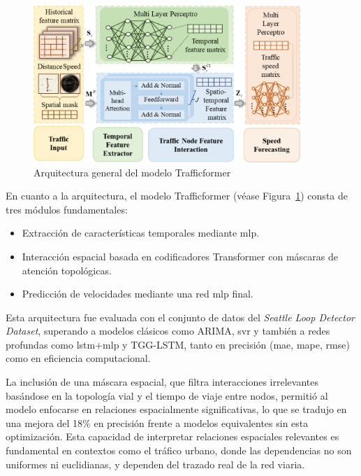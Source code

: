 \begin{figure}[H]
	\centering
	\includegraphics[width=0.9\textwidth]{includes/fnbot-19-1527908-g001.jpg}
	\caption{Arquitectura general del modelo Trafficformer \cite{trafficformer}}
	\label{fig:trafficformer}
\end{figure}

En cuanto a la arquitectura, el modelo Trafficformer (véase Figura~\ref{fig:trafficformer}) consta de tres módulos fundamentales:
\begin{itemize}
	\item[(1)] Extracción de características temporales mediante \acrlong{mlp}. 
	\item[(2)] Interacción espacial basada en codificadores Transformer con máscaras de atención topológicas. 
	\item[(3)] Predicción de velocidades mediante una red \acrshort{mlp} final. 
\end{itemize}

Esta arquitectura fue evaluada con el conjunto de datos del \textit{Seattle Loop Detector Dataset}, superando a modelos clásicos como ARIMA, \acrshort{svr} y también a redes profundas como \acrshort{lstm}+\acrshort{mlp} y TGG-LSTM, tanto en precisión (\acrshort{mae}, \acrshort{mape}, \acrshort{rmse}) como en eficiencia computacional.

La inclusión de una máscara espacial, que filtra interacciones irrelevantes basándose en la topología vial y el tiempo de viaje entre nodos, permitió al modelo enfocarse en relaciones espacialmente significativas, lo que se tradujo en una mejora del 18\% en precisión frente a modelos equivalentes sin esta optimización. Esta capacidad de interpretar relaciones espaciales relevantes es fundamental en contextos como el tráfico urbano, donde las dependencias no son uniformes ni euclidianas, y dependen del trazado real de la red viaria.

